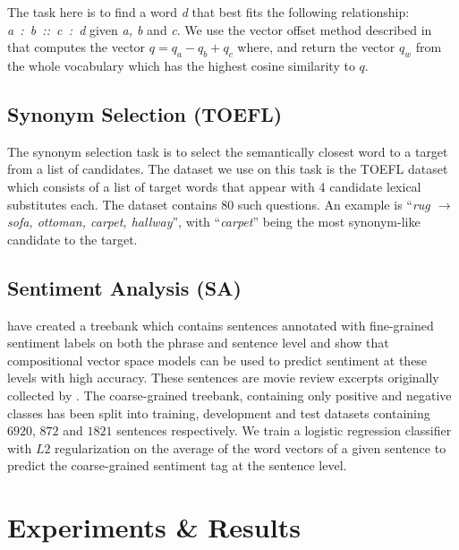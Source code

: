 \documentclass[11pt]{article}
\DeclareMathOperator*{\argmax}{arg\,max}
\begin{document}
The task here is to find a word \textit{d} that best fits the following relationship: 
\textit{a~:~b~::~c~:~d} given \textit{a, b} and \textit{c}. 
We use the vector offset method described in 
 that computes the vector $q = q_a - q_b + q_c$ where, 
 and return the 
vector $q_w$ from the whole vocabulary which has the highest cosine similarity to $q$.

\subsection{Synonym Selection (TOEFL)}
\label{ref:toefl}

The synonym selection task is to select the semantically closest word to a target from a list of candidates. The dataset we use on this task is the TOEFL dataset \cite{landauer:1997} which consists of a list of target words that appear with 4 candidate lexical substitutes each. The dataset contains 80 such questions. An example is ``\textit{rug $\rightarrow$ sofa, ottoman, carpet, hallway}'', with ``\textit{carpet}'' being the most synonym-like candidate to the target.

\subsection{Sentiment Analysis (SA)}
\label{sec:senti}

 have created a treebank which contains sentences
annotated with fine-grained sentiment labels on both the phrase and sentence level
and show that compositional vector space models can be used to predict sentiment
at these levels with high accuracy.
These sentences are movie review excerpts originally collected by .
The coarse-grained treebank, containing only positive and negative 
classes has been split into training, development and test datasets containing $6920$, $872$ and 
$1821$ sentences respectively. We train a logistic regression classifier with $L2$ regularization
on the average of the word 
vectors of a given sentence to predict the coarse-grained sentiment tag at the sentence level.

\section{Experiments \& Results}
\label{sec:expts}
\end{document}

